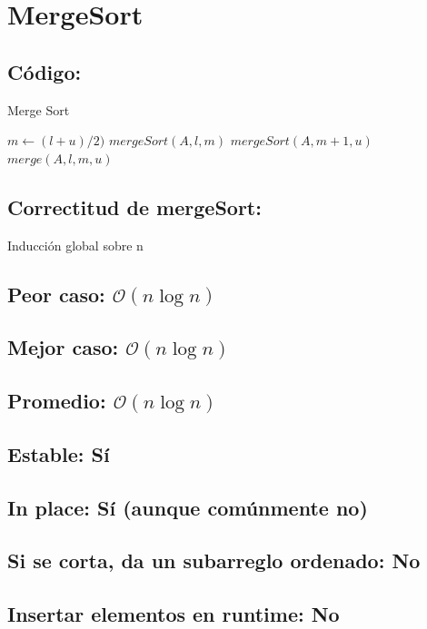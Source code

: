 \documentclass[a4paper]{article}
\begin{document}
\section{MergeSort}

\subsection{C\'odigo:}
\begin{algorithm}
\caption{Merge Sort}\label{selection}
\begin{algorithmic}[1]
		\State $m \gets (l+u)/2)$
		\State $mergeSort(A,l,m)$
		\State $mergeSort(A,m+1,u)$
		\State $merge(A,l,m,u)$
	\EndIf
\EndProcedure
\end{algorithmic}
\end{algorithm}

\subsection{Correctitud de mergeSort:}
Inducci\'on global sobre n 

\subsection{Peor caso: $\mathcal{O}(n \log{}n)$}
\subsection{Mejor caso: $\mathcal{O}(n \log{}n)$}
\subsection{Promedio: $\mathcal{O}(n \log{}n)$}
\subsection{Estable: S\'i}
\subsection{In place: S\'i (aunque com\'unmente no)}
\subsection{Si se corta, da un subarreglo ordenado: No}
\subsection{Insertar elementos en runtime: No}
\end{document}
